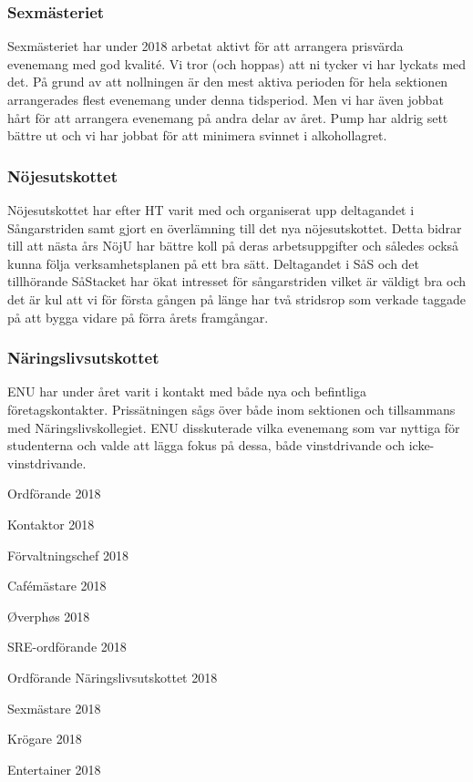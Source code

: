 \documentclass[../_main/handlingar.tex]{subfiles}
\begin{document}
\subsubsection*{Sexmästeriet}

Sexmästeriet har under 2018 arbetat aktivt för att arrangera prisvärda evenemang med god
kvalité. Vi tror (och hoppas) att ni tycker vi har lyckats med det. På grund av att nollningen är
den mest aktiva perioden för hela sektionen arrangerades flest evenemang under denna
tidsperiod. Men vi har även jobbat hårt för att arrangera evenemang på andra delar av året.
Pump har aldrig sett bättre ut och vi har jobbat för att minimera svinnet i alkohollagret.

\subsubsection*{Nöjesutskottet}

Nöjesutskottet har efter HT varit med och organiserat upp deltagandet i Sångarstriden samt
gjort en överlämning till det nya nöjesutskottet. Detta bidrar till att nästa års NöjU har bättre
koll på deras arbetsuppgifter och således också kunna följa verksamhetsplanen på ett bra
sätt. Deltagandet i SåS och det tillhörande SåStacket har ökat intresset för sångarstriden
vilket är väldigt bra och det är kul att vi för första gången på länge har två stridsrop som
verkade taggade på att bygga vidare på förra årets framgångar.

\subsubsection*{Näringslivsutskottet}

ENU har under året varit i kontakt med både nya och befintliga företagskontakter. Prissätningen sågs
över både inom sektionen och tillsammans med Näringslivskollegiet. ENU disskuterade vilka
evenemang som var nyttiga för studenterna och valde att lägga fokus på dessa, både vinstdrivande och
icke-vinstdrivande.

\newpage
\begin{signatures}{10}
    \mvh
    \signature{Daniel Bakic}{Ordförande 2018}
    \signature{Axel Voss}{Kontaktor 2018}
    \signature{Magnus Lundh}{Förvaltningschef 2018}
    \signature{Elin Johansson}{Cafémästare 2018}
    \signature{Andreas Bennström}{Øverphøs 2018}
    \signature{Fanny Månefjord}{SRE-ordförande 2018}
    \signature{Isabella Hansen}{Ordförande Näringslivsutskottet 2018}
    \signature{Alexander Wik}{Sexmästare 2018}
    \signature{Malin Heyden}{Krögare 2018}
    \signature{Adam Belfrage}{Entertainer 2018}
\end{signatures}
\end{document}
